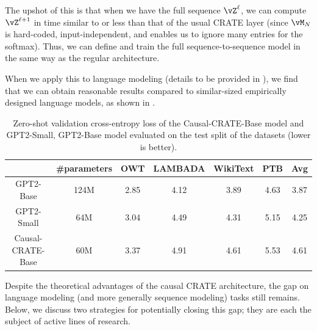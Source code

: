\documentclass[../../book-main.tex]{subfiles}
\begin{document}
The upshot of this is that when we have the full sequence
\(\vZ^{\ell}\), we can compute \(\vZ^{\ell + 1}\) in time similar to
or less than that of the usual CRATE layer (since \(\vM_{N}\) is
    hard-coded, input-independent, and enables us to ignore many entries
for the softmax). Thus, we can define and train the full
sequence-to-sequence model in the same way as the regular architecture.

When we apply this to language modeling (details to be provided in
), we find that we can obtain reasonable
results compared to similar-sized empirically designed language
models, as shown in .

\begin{table}[t!]
    \small
    \caption{\small Zero-shot validation cross-entropy loss of the
        Causal-CRATE-Base model and GPT2-Small, GPT2-Base model
        evaluated on the test split of the datasets (lower is better).
    }
    \centering
    \resizebox{1\columnwidth}{!}
    {
        \begin{tabular}{ccccccc}
            \hline
            & \#parameters & OWT & LAMBADA &
            WikiText & PTB & Avg \\
            \hline
            \hline
            GPT2-Base  & {124M} & 2.85 & 4.12 & 3.89 & 4.63 & 3.87 \\
            {GPT2-Small } &  {64M} & {3.04} & {4.49} & {4.31} &
            {5.15} & {4.25} \\
            Causal-CRATE-Base & {60M} & 3.37 & 4.91 & 4.61 & 5.53 & 4.61 \\
            \hline
        \end{tabular}
    }
    \label{tab:causal-crate-results}
\end{table}

Despite the theoretical advantages of the causal CRATE architecture,
the gap on language modeling (and more generally sequence modeling)
tasks still remains. Below, we discuss two strategies for potentially
closing this gap; they are each the subject of active lines of research.
\end{document}
